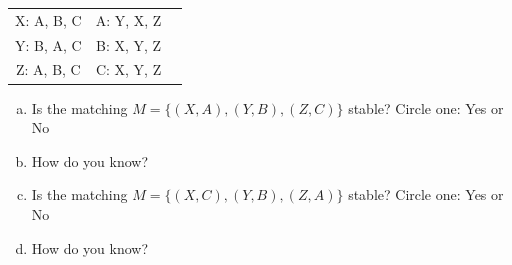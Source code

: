 \documentclass[11pt]{article}
\begin{document}
\begin{enumerate}
\begin{center}
\begin{tabular}{ c c c }
    X: A, B, C &  A: Y, X, Z\\
    Y: B, A, C & B: X, Y, Z\\
    Z: A, B, C &  C: X, Y, Z
\end{tabular}
\end{center}

\begin{enumerate}[(a)]

\item Is the matching $M = \{(X, A), (Y, B), (Z, C)\}$ stable? Circle one: Yes or No

\item How do you know?
\vspace{1in}

\item Is the matching $M = \{(X, C), (Y, B), (Z, A)\}$ stable? Circle one: Yes or No

\item How do you know?
\vspace{1in}
    
\end{enumerate}

\end{enumerate}
\end{document}
